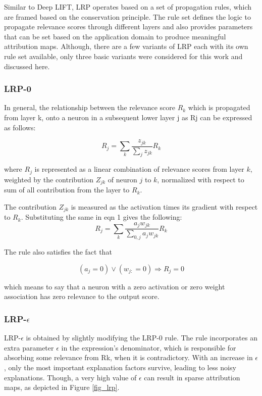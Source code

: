 \documentclass[../report.tex]{subfiles}
\begin{document}
Similar to Deep LIFT, LRP operates based on a set of propagation rules, which are framed based on the conservation principle. The rule set defines the logic to propagate relevance scores through different layers and also provides parameters that can be set based on the application domain to produce meaningful attribution maps. Although, there are a few variants of LRP each with its own rule set available, only three basic variants were considered for this work and discussed here.

\subsubsection{LRP-0}
In general,  the relationship between the relevance score $R_{k}$ which is propagated from layer k, onto a neuron in a subsequent lower layer j as Rj can be expressed as follows:

\begin{equation}
	R_j=\sum_k \frac{z_{j k}}{\sum_j z_{j k}} R_k
\end{equation}

where $R_j$ is represented as a linear combination of relevance scores from layer $k$, weighted by the  contribution $Z_{jk}$ of neuron $j$ to $k$, normalized with respect to sum of all contribution from the layer to $R_k$.

The contribution $Z_{jk}$ is measured as the activation times its gradient with respect to $R_k$. Substituting the same in eqn 1 gives the following:\\
\begin{equation}
	R_j=\sum_k \frac{a_j w_{j k}}{\sum_{0, j} a_j w_{j k}} R_k
\end{equation}


The rule also satisfies the fact that 

\begin{equation}
	\left(a_j=0\right) \vee\left(w_{j:}=0\right) \Rightarrow R_j=0
\end{equation}

which means to say that a neuron with a zero activation or zero weight association has zero relevance to the output score.

\subsubsection{LRP-$\epsilon$}

LRP-$\epsilon$ is obtained by slightly modifying the LRP-0 rule. The rule incorporates an extra parameter $\epsilon$ in the expression’s denominator, which is responsible for absorbing some relevance from Rk, when it is contradictory. With an increase in $\epsilon$, only the most important explanation factors survive, leading to less noisy explanations. Though, a very high value of $\epsilon$ can result in sparse attribution maps, as depicted in Figure \ref{fig_lrp}.
\end{document}
